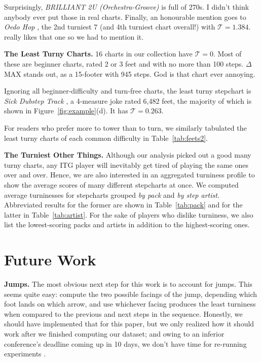 \documentclass[10pt]{sigplanconf}
\begin{document}
Surprisingly, {\em BRILLIANT 2U (Orchestra-Groove)} \cite{brilliant2u} is full of 270s. I didn't think anybody ever put those in real charts.
Finally, an honourable mention goes to {\em Oedo Hop} \cite{oedo}, the 2nd turniest 7 (and 4th turniest chart overall!) with $\mathcal{T}=1.384$.
\cite{deltax} really likes that one so we had to mention it.

{\bf The Least Turny Charts.}
16 charts in our collection have $\mathcal{T}=0$. Most of these are beginner charts, rated 2 or 3 feet and with no more than 100 steps. $\Delta$MAX \cite{deltamax} stands out, as a 15-footer with 945 steps. God is that chart ever annoying.

Ignoring all beginner-difficulty and turn-free charts, the least turny stepchart is {\em Sick Dubstep Track} \cite{sickdubstep}, a 4-measure joke rated 6,482 feet, the majority of which is shown in Figure~\ref{fig:example}(d). It has $\mathcal{T}=0.263$.

For readers who prefer more to tower than to turn, we similarly tabulated the least turny charts of each common difficulty in Table~\ref{tab:feets2}.

{\bf The Turniest Other Things.}
Although our analysis picked out a good many turny charts, any ITG player will inevitably get tired of playing the same ones over and over.
Hence, we are also interested in an aggregated turniness profile to show the average scores of many different stepcharts at once.
We computed average turninesses for stepcharts grouped {\em by pack} and {\em by step artist}.
Abbreviated results for the former are shown in Table~\ref{tab:pack} and for the latter in Table~\ref{tab:artist}.
For the sake of players who dislike turniness, we also list the lowest-scoring packs and artists in addition to the highest-scoring ones.

\section{Future Work}

{\bf Jumps.} The most obvious next step for this work is to account for jumps.
This seems quite easy: compute the two possible facings of the jump, depending which foot lands on which arrow, and use whichever facing produces the least turniness when compared to the previous and next steps in the sequence.
Honestly, we should have implemented that for this paper, but we only realized how it should work after we finished computing our dataset;
and owing to an inferior conference's deadline coming up in 10 days, we don't have time for re-running experiments .
\end{document}
